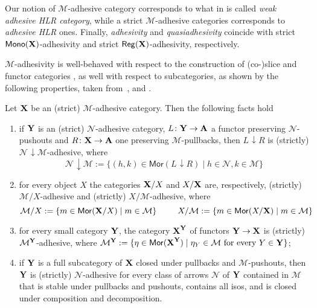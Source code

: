 \documentclass[3p]{elsarticle}
\def\X{\textbf {\textup{X}}}
\def\Y{\textbf {\textup{Y}}}
\def\A{\textbf {\textup{A}}}
\renewcommand{\comma}[2]{#1\hspace{1pt} {\downarrow}#2}
\newcommand{\mor}{\mathsf{Mor}}
\newcommand{\mon}{\mathsf{Mono}}
\newcommand{\reg}{\mathsf{Reg}}
\theoremstyle{remark}
\theoremstyle{definition}
\begin{document}
\begin{rem}
	\label{rem:salva} Our notion of $\mathcal{M}$-adhesive category corresponds to what in \cite{ehrig2006fundamentals} is called \emph{weak adhesive HLR category}, while a strict $\mathcal{M}$-adhesive categories corresponds to \emph{adhesive HLR} ones. Finally, 	\emph{adhesivity} and \emph{quasiadhesivity} 
	\cite{lack2005adhesive,garner2012axioms} coincide with strict
	$\mon(\X) $-adhesivity and strict $\reg(\X)$-adhesivity,
	respectively. %
\end{rem}


$\mathcal{M}$-adhesivity is well-behaved with respect to  the construction of (co-)slice and functor categories \cite{mac2013categories}, as well with respect to subcategories, as shown by the following properties, taken from~\cite[Thm.~4.15]{ehrig2006fundamentals}, \cite[Prop.~3.5]{lack2005adhesive} and  \cite[Thm.~2.12]{CastelnovoGM24}.

\begin{thm}
	\label{thm:slice-functors}
	Let $\X$ be an (strict) $\mathcal{M}$-adhesive category. Then the following facts hold
	\begin{enumerate}
		\item if $\Y$ is an (strict) $\mathcal{N}$-adhesive category, $L\colon \Y\to \A$ a functor preserving $\mathcal{N}$-pushouts and $R\colon \X\to \A$ one preserving $\mathcal{M}$-pullbacks, then $\comma{L}{R}$ is (strictly) $\comma{\mathcal{N}}{\mathcal{M}}$-adhesive, where
		\[\comma{\mathcal{N}}{\mathcal{M}}:=\{(h,k) \in \mor(\comma{L}{R}) \mid h\in \mathcal{N}, k\in \mathcal{M}\}\]
		\item for every object $X$
		the categories $\X/X$  and $X/\X$ are, respectively, (strictly) $\mathcal{M}/X$-adhesive and (strictly) $X/\mathcal{M}$-adhesive, where
		\[\mathcal{M}/X:=\{m\in \mor(\X/X) \mid m\in
		\mathcal{M}\} \hspace{25pt} X/\mathcal{M}:=\{m\in \mor(X/\X) \mid m\in \mathcal{M}\}\]
		\item for every small category $\Y$, the category $\X^\Y$ of
		functors $\Y\to \X$ is (strictly) $\mathcal{M}^{\Y}$-adhesive, where
		$\mathcal{M}^{\Y}:=\{\eta \in \mor(\X^\Y) \mid \eta_Y \in
		\mathcal{M} \text{ for every } Y\in \Y\}$;
		\item if $\Y$ is a full subcategory of $\X$ closed under pullbacks and $\mathcal{M}$-pushouts, then $\Y$ is (strictly) $\mathcal{N}$-adhesive for every class of arrows $\mathcal{N}$ of $\Y$ contained in $\mathcal{M}$ that is stable under pullbacks and pushouts, contains all isos, and is closed under composition and decomposition.
	\end{enumerate} 
\end{thm}
\end{document}
